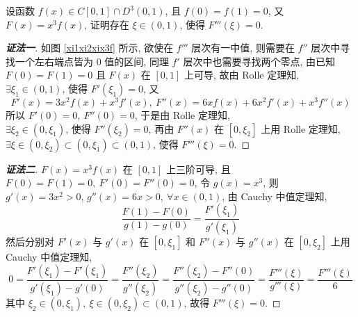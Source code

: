 \begin{example}
    设函数 $f(x)\in C[0,1]\cap D^3(0,1)$, 且 $f(0)=f(1)=0$, 又 $F(x)=x^3f(x)$, 证明存在 $\xi\in(0,1)$, 使得 $F'''(\xi)=0.$
\end{example}
\begin{proof}[{\songti \textbf{证法一}}]
    如图 \ref{xi1xi2xix3f} 所示, 欲使在 $f'''$ 层次有一中值, 则需要在 $f''$ 层次中寻找一个左右端点皆为 0 值的区间, 同理 $f'$ 层次中也需要寻找两个零点, 
    由已知 $F(0)=F(1)=0$ 且 $F(x)$ 在 $[0,1]$ 上可导, 故由 Rolle 定理知, 
    $\exists\xi_1\in(0,1)\text{, 使得 }F'(\xi_1)=0$, 
    又 $$F'(x)=3x^2f(x)+x^3f'(x),~F''(x)=6xf(x)+6x^2f'(x)+x^3f''(x)$$
    所以 $F'(0)=0,~F''(0)=0$, 于是由 Rolle 定理知, 
    $\exists\xi_2\in(0,\xi_1)\text{, 使得 }F''(\xi_2)=0$, 
    再由 $F''(x)$ 在 $[0,\xi_2]$ 上用 Rolle 定理知, $\exists\xi\in(0,\xi_2)\subset(0,\xi_1)\subset(0,1)\text{, 使得 }F'''(\xi)=0.$
\end{proof}
\begin{proof}[{\songti \textbf{证法二}}]
    $F(x)=x^3f(x)$ 在 $[0,1]$ 上三阶可导, 且 $F(0)=F(1)=0,~F'(0)=F''(0)=0$, 令 $g(x)=x^3$, 则 $g'(x)=3x^2>0$, $g''(x)=6x>0,~\forall x\in(0,1)$, 
    由 Cauchy 中值定理知, $$\dfrac{F(1)-F(0)}{g(1)-g(0)}=\dfrac{F'(\xi_1)}{g'(\xi_1)}$$
    然后分别对 $F'(x)$ 与 $g'(x)$ 在 $[0,\xi_1]$ 和 $F''(x)$ 与 $g''(x)$ 在 $[0,\xi_2]$ 上用 Cauchy 中值定理知, 
    $$0=\dfrac{F'(\xi_1)-F'(\xi_1)}{g'(\xi_1)-g'(0)}=\dfrac{F''(\xi_2)}{g''(\xi_2)}=\dfrac{F''(\xi_2)-F''(0)}{g''(\xi_2)-g''(0)}=\dfrac{F'''(\xi)}{g'''(\xi)}=\dfrac{F'''(\xi)}{6}$$
    其中 $\xi_2\in(0,\xi_1),~\xi\in(0,\xi_2)\subset(0,1)$, 故得 $F'''(\xi)=0.$
\end{proof}

